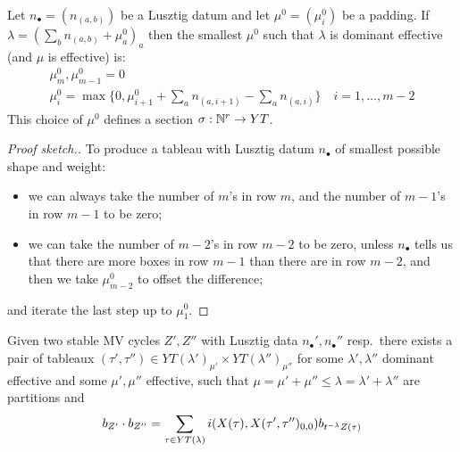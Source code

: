 \documentclass{article}
\begin{document}
\begin{lemma}
\label{lem:almostmintab}
Let $n_\bullet = (n_{(a,b)})$ be a Lusztig datum and let $\mu^0 = (\mu^0_i)$ be a padding. If $\lambda = (\sum_b n_{(a,b)} + \mu^0_a)_a $ then the smallest $\mu^0$ such that $\lambda$ is dominant effective (and $\mu$ is effective) is:
$$
\begin{gathered}
        \mu^0_{m}, \mu^0_{m-1} = 0 \\
        \mu^0_i = \max\{0, \mu_{i+1}^0 + \sum_a n_{(a,i+1)} - \sum_a n_{(a,i)}\} \quad i = 1,\dots,m-2
\end{gathered}
$$
This choice of $\mu^0$ defines a section $\sigma:\mathbb N^{r} \to YT$.
\end{lemma}
% 
\begin{proof}[Proof sketch.]
To produce a tableau with Lusztig datum $n_\bullet$ of smallest possible shape and weight:
\begin{itemize}
    \item we can always take the number of $m$'s in row $m$, and the number of $m-1$'s in row $m-1$ to be zero; 
    \item we can take the number of $m-2$'s in row $m-2$ to be zero, unless $n_\bullet$ tells us that there are more boxes in row $m-1$ than there are in row $m-2$, and then we take $\mu^0_{m-2}$ to offset the difference; 
\end{itemize}
and iterate the last step up to $\mu^0_1$. 
\end{proof}
% 
\begin{corollary}
\label{cor:goodreps}
Given two stable MV cycles $Z',Z''$ with Lusztig data $n_\bullet',n_\bullet''$ resp.\ there exists a pair of tableaux $(\tau',\tau'')\in YT(\lambda')_{\mu'}\times YT(\lambda'')_{\mu''}$ for some $\lambda',\lambda''$ dominant effective and some $\mu',\mu''$ effective, such that $\mu = \mu' + \mu''\le \lambda = \lambda' + \lambda''$ are partitions and  
\begin{equation}
    \label{eq:multingeneralized orbital varieties}
    b_{Z'} \cdot b_{Z''} = \sum_{\tau\in YT(\lambda)} i (X(\tau), X(\tau',\tau'')_{0,0})b_{t^{-\lambda}Z(\tau)}
\end{equation}
\end{corollary}
% 
\end{document}
